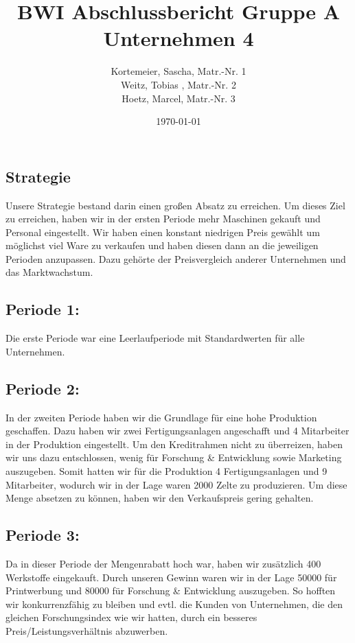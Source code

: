 \documentclass[a4paper, 12pt]{report}
\title{BWI Abschlussbericht Gruppe A Unternehmen 4}
\author{Kortemeier, Sascha, Matr.-Nr. 1 \\
Weitz, Tobias , Matr.-Nr. 2 \\
Hoetz, Marcel, Matr.-Nr. 3}
\date{\today}
\begin{document}
\maketitle
\tableofcontents



\begin{flushleft}
\chapter{Strategie}
Unsere Strategie bestand darin einen großen Absatz zu erreichen. 
Um dieses Ziel zu erreichen, haben wir in der ersten Periode mehr Maschinen gekauft und Personal eingestellt. 
Wir haben einen konstant niedrigen Preis gewählt um möglichst viel Ware zu verkaufen und haben diesen dann an die jeweiligen Perioden anzupassen. 
Dazu gehörte der Preisvergleich anderer Unternehmen und das Marktwachstum. 

\section{Periode 1:}
Die erste Periode war eine Leerlaufperiode mit Standardwerten für alle Unternehmen.	

\section{Periode 2:}
In der zweiten Periode haben wir die Grundlage für eine hohe Produktion geschaffen.
Dazu haben wir zwei Fertigungsanlagen angeschafft und 4 Mitarbeiter in der Produktion eingestellt.
Um den Kreditrahmen nicht zu überreizen, haben wir uns dazu entschlossen, wenig für Forschung \& Entwicklung sowie Marketing auszugeben.
Somit hatten wir für die Produktion 4 Fertigungsanlagen und 9 Mitarbeiter, wodurch wir in der Lage waren 2000 Zelte zu produzieren.
Um diese Menge absetzen zu können, haben wir den Verkaufspreis gering gehalten.

\section{Periode 3:}
Da in dieser Periode der Mengenrabatt hoch war, haben wir zusätzlich 400 Werkstoffe eingekauft. 
Durch unseren Gewinn waren wir in der Lage 50000\texteuro{} für Printwerbung und 80000\texteuro{} für Forschung \& Entwicklung auszugeben.
So hofften wir konkurrenzfähig zu bleiben und evtl. die Kunden von Unternehmen, die den gleichen Forschungsindex wie wir hatten, durch ein besseres Preis/Leistungsverhältnis abzuwerben.


\end{flushleft}
\end{document}
